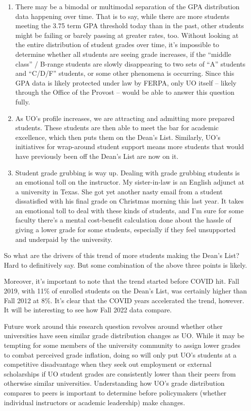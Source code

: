 \documentclass[10]{article}
\begin{document}
\begin{enumerate}
	\item There may be a bimodal or multimodal separation of the GPA distribution data happening over time. That is to say, while there are more students meeting the 3.75 term GPA threshold today than in the past, other students might be failing or barely passing at greater rates, too. Without looking at the entire distribution of student grades over time, it's impossible to determine whether all students are seeing grade increases, if the ``middle class'' / B-range students are slowly disappearing to two sets of ``A'' students and ``C/D/F'' students, or some other phenomena is occurring. Since this GPA data is likely protected under law by FERPA, only UO itself -- likely through the Office of the Provost -- would be able to answer this question fully.
	\item As UO's profile increases, we are attracting and admitting more prepared students. These students are then able to meet the bar for academic excellence, which then puts them on the Dean's List. Similarly, UO's initiatives for wrap-around student support means more students that would have previously been off the Dean's List are now on it.
	\item Student grade grubbing is way up. Dealing with grade grubbing students is an emotional toll on the instructor. My sister-in-law is an English adjunct at a university in Texas. She got yet another nasty email from a student dissatisfied with his final grade on Christmas morning this last year. It takes an emotional toll to deal with these kinds of students, and I'm sure for some faculty there's a mental cost-benefit calculation done about the hassle of giving a lower grade for some students, especially if they feel unsupported and underpaid by the university.
\end{enumerate}

So what are the drivers of this trend of more students making the Dean's List? Hard to definitively say. But some combination of the above three points is likely.

Moreover, it's important to note that the trend started before COVID hit. Fall 2019, with 11\% of enrolled students on the Dean's List, was certainly higher than Fall 2012 at 8\%. It's clear that the COVID years accelerated the trend, however. It will be interesting to see how Fall 2022 data compare.

Future work around this research question revolves around whether other universities have seen similar grade distribution changes as UO. While it may be tempting for some members of the university community to assign lower grades to combat perceived grade inflation, doing so will only put UO's students at a competitive disadvantage when they seek out employment or external scholarships if UO student grades are consistently lower than their peers from otherwise similar universities. Understanding how UO's grade distribution compares to peers is important to determine before policymakers (whether individual instructors or academic leadership) make changes.
\end{document}
